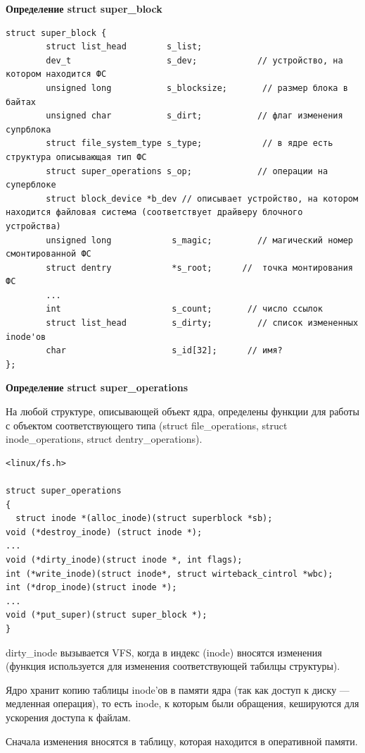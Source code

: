 \textbf{Определение struct super\_block}

\begin{lstlisting}
struct super_block {
        struct list_head        s_list;            
        dev_t                   s_dev;            // устройство, на котором находится ФС
        unsigned long           s_blocksize;       // размер блока в байтах
        unsigned char           s_dirt;           // флаг изменения супрблока
        struct file_system_type s_type;            // в ядре есть структура описывающая тип ФС
        struct super_operations s_op;             // операции на суперблоке
        struct block_device *b_dev // описывает устройство, на котором находится файловая система (соответствует драйверу блочного устройства)
        unsigned long            s_magic;         // магический номер смонтированной ФС
        struct dentry            *s_root;      //  точка монтирования ФС
        ...
        int                      s_count;       // число ссылок
        struct list_head         s_dirty;         // список измененных inode'ов
        char                     s_id[32];      // имя?
};
\end{lstlisting}

\textbf{Определение struct super\_operations}

На любой структуре, описывающей объект ядра, определены функции для работы с объектом соответствующего типа (struct file\_operations, struct inode\_operations, struct dentry\_operations).

\begin{lstlisting}
<linux/fs.h>

struct super_operations
{
  struct inode *(alloc_inode)(struct superblock *sb);
void (*destroy_inode) (struct inode *);
...
void (*dirty_inode)(struct inode *, int flags);
int (*write_inode)(struct inode*, struct wirteback_cintrol *wbc);
int (*drop_inode)(struct inode *);
...
void (*put_super)(struct super_block *);
}

\end{lstlisting}


dirty\_inode вызывается VFS, когда в индекс (inode) вносятся изменения (функция используется для изменения соответствующей табилцы структуры).

Ядро хранит копию таблицы inode'ов в памяти ядра (так как доступ к диску — медленная операция), то есть inode, к которым были обращения, кешируются для ускорения доступа к файлам.

Сначала изменения вносятся в таблицу, которая находится в оперативной памяти.


